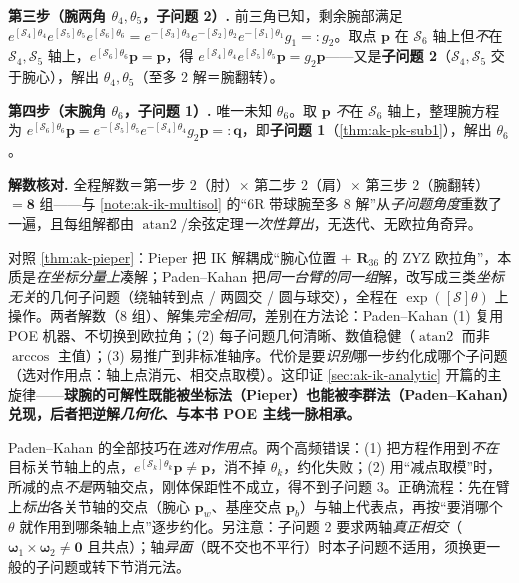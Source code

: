 \begin{example}
\textbf{第三步（腕两角 $\theta_4,\theta_5$，子问题 2）.} 前三角已知，剩余腕部满足 $e^{[\mathcal{S}_4]\theta_4}e^{[\mathcal{S}_5]\theta_5}e^{[\mathcal{S}_6]\theta_6}=e^{-[\mathcal{S}_3]\theta_3}e^{-[\mathcal{S}_2]\theta_2}e^{-[\mathcal{S}_1]\theta_1}g_1=:g_2$。取点 $\mathbf{p}$ 在 $\mathcal{S}_6$ 轴上但\emph{不}在 $\mathcal{S}_4,\mathcal{S}_5$ 轴上，$e^{[\mathcal{S}_6]\theta_6}\mathbf{p}=\mathbf{p}$，得 $e^{[\mathcal{S}_4]\theta_4}e^{[\mathcal{S}_5]\theta_5}\mathbf{p}=g_2\mathbf{p}$——又是\textbf{子问题 2}（$\mathcal{S}_4,\mathcal{S}_5$ 交于腕心），解出 $\theta_4,\theta_5$（至多 2 解＝腕翻转）。

\textbf{第四步（末腕角 $\theta_6$，子问题 1）.} 唯一未知 $\theta_6$。取 $\mathbf{p}$ \emph{不}在 $\mathcal{S}_6$ 轴上，整理腕方程为 $e^{[\mathcal{S}_6]\theta_6}\mathbf{p}=e^{-[\mathcal{S}_5]\theta_5}e^{-[\mathcal{S}_4]\theta_4}g_2\mathbf{p}=:\mathbf{q}$，即\textbf{子问题 1}（\cref{thm:ak-pk-sub1}），解出 $\theta_6$。

\textbf{解数核对.} 全程解数＝第一步 $2$（肘）$\times$ 第二步 $2$（肩）$\times$ 第三步 $2$（腕翻转）$=\mathbf{8}$ 组——与 \cref{note:ak-ik-multisol} 的“6R 带球腕至多 8 解”从\emph{子问题角度}重数了一遍，且每组解都由 $\operatorname{atan2}$/余弦定理\emph{一次性算出}，无迭代、无欧拉角奇异。
\end{example}

\begin{insight}\label{ins:ak-pieper-vs-pk}
对照 \cref{thm:ak-pieper}：Pieper 把 IK 解耦成“腕心位置 $+$ $\mathbf{R}_{36}$ 的 ZYZ 欧拉角”，本质是\emph{在坐标分量上}凑解；Paden--Kahan 把\emph{同一台臂的同一组}解，改写成三类\emph{坐标无关}的几何子问题（绕轴转到点 / 两圆交 / 圆与球交），全程在 $\exp([\mathcal{S}]\theta)$ 上操作。两者解数（8 组）、解集\emph{完全相同}，差别在方法论：Paden--Kahan (1) 复用 POE 机器、不切换到欧拉角；(2) 每子问题几何清晰、数值稳健（$\operatorname{atan2}$ 而非 $\arccos$ 主值）；(3) 易推广到非标准轴序。代价是要\emph{识别}哪一步约化成哪个子问题（选对作用点：轴上点消元、相交点取模）。这印证 \cref{sec:ak-ik-analytic} 开篇的主旋律——\textbf{球腕的可解性既能被坐标法（Pieper）也能被李群法（Paden--Kahan）兑现，后者把逆解\emph{几何化}、与本书 POE 主线一脉相承。}
\end{insight}

\begin{pitfall}
Paden--Kahan 的全部技巧在\emph{选对作用点}。两个高频错误：(1) 把方程作用到\emph{不在}目标关节轴上的点，$e^{[\mathcal{S}_k]\theta_k}\mathbf{p}\neq\mathbf{p}$，消不掉 $\theta_k$，约化失败；(2) 用“减点取模”时，所减的点\emph{不是}两轴交点，刚体保距性不成立，得不到子问题 3。正确流程：先在臂上\emph{标出}各关节轴的交点（腕心 $\mathbf{p}_w$、基座交点 $\mathbf{p}_b$）与轴上代表点，再按“要消哪个 $\theta$ 就作用到哪条轴上点”逐步约化。另注意：子问题 2 要求两轴\emph{真正相交}（$\boldsymbol{\omega}_1\times\boldsymbol{\omega}_2\neq\mathbf{0}$ 且共点）；轴\emph{异面}（既不交也不平行）时本子问题不适用，须换更一般的子问题或转下节消元法。
\end{pitfall}

